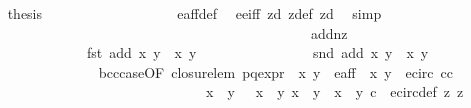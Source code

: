 \begin{isabellebody}
\ \isamarkupfalse%
\ {\isacharquery}thesis\ \isanewline
\ \ \ \ \ \ \ \ \ \ \ \ \ \ \ \ \isamarkupfalse%
\ e{\isacharunderscore}aff{\isacharunderscore}def\ \isamarkupfalse%
\ e{\isacharunderscore}e{\isacharprime}{\isacharunderscore}iff\ z{}{\isacharunderscore}d\ z{}{\isacharunderscore}def\ z{}{\isacharunderscore}d\ \isamarkupfalse%
\ simp\isanewline
\ \ \ \ \ \ \ \ \ \ \ \ \isamarkupfalse%
\ \ \ \ \ \ \isanewline
\isanewline
\ \ \ \ \ \ \ \ \ \ \ \ \ \ \ \ \ \ \ \ \ \ \ \ \ \isanewline
\ \ \ \ \ \ \ \ \ \ \ \ \isamarkupfalse%
\ add{\isacharunderscore}nz{\isacharcolon}\ \isanewline
\ \ \ \ \ \ \ \ \ \ \ \ \ \ {\isachardoublequoteopen}fst\ {\isacharparenleft}add\ {\isacharparenleft}x{\isacharcomma}\ y{\isacharparenright}\ {\isacharparenleft}{\isasymtau}\ {\isacharparenleft}x{\isacharprime}{\isacharcomma}\ y{\isacharprime}{\isacharparenright}{\isacharparenright}{\isacharparenright}\ {\isasymnoteq}\ {}{\isachardoublequoteclose}\isanewline
\ \ \ \ \ \ \ \ \ \ \ \ \ \ {\isachardoublequoteopen}snd\ {\isacharparenleft}add\ {\isacharparenleft}x{\isacharcomma}\ y{\isacharparenright}\ {\isacharparenleft}{\isasymtau}\ {\isacharparenleft}x{\isacharprime}{\isacharcomma}\ y{\isacharprime}{\isacharparenright}{\isacharparenright}{\isacharparenright}\ {\isasymnoteq}\ {}{\isachardoublequoteclose}\isanewline
\ \ \ \ \ \ \ \ \ \ \ \ \ \ \isamarkupfalse%
\ b{\isacharunderscore}cc{\isacharunderscore}case{\isacharbrackleft}OF\ closure{\isacharunderscore}lem\ p{\isacharunderscore}q{\isacharunderscore}expr{\isacharparenleft}{}{\isacharparenright}\ {\isacartoucheopen}{\isasymtau}\ {\isacharparenleft}x{\isacharprime}{\isacharcomma}\ y{\isacharprime}{\isacharparenright}\ {\isasymin}\ e{\isacharunderscore}aff{\isacartoucheclose}\ {\isacartoucheopen}{\isasymtau}\ {\isacharparenleft}x{\isacharprime}{\isacharcomma}\ y{\isacharprime}{\isacharparenright}\ {\isasymin}\ e{\isacharunderscore}circ{\isacartoucheclose}\ cc\isanewline
\ \ \ \ \ \ \ \ \ \ \ \ \ \ \ \ \ \ \ \ \ \ \ \ \ \ \ \ \ \ \ {\isacartoucheopen}x{\isacharprime}\ {\isacharasterisk}\ y{\isacharprime}\ {\isasymnoteq}\ {\isacharminus}\ x\ {\isacharasterisk}\ y{\isacartoucheclose}\ {\isacartoucheopen}x{\isacharprime}\ {\isacharasterisk}\ y{\isacharprime}\ {\isasymnoteq}\ x\ {\isacharasterisk}\ y{\isacartoucheclose}\ c{\isacharparenleft}{}{\isacharparenright}{\isacharbrackright}\ \ e{\isacharunderscore}circ{\isacharunderscore}def\ z{}{\isacharparenleft}{}{\isacharparenright}\ z{}{\isacharparenleft}{}{\isacharparenright}\ \isanewline

\end{isabellebody}
